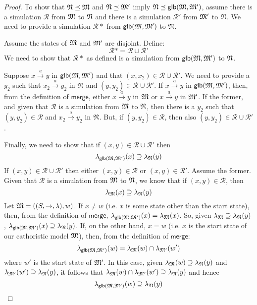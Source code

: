 \begin{proof}
To show that $\frak{N} \preceq \frak{M}$ and $\frak{N} \preceq \frak{M}'$ imply $\frak{N} \preceq \mathsf{glb}(\frak{M}, \frak{M}')$, assume there is a simulation $\mathcal{R}$ from $\frak{M}$ to $\frak{N}$ and there is a simulation $\mathcal{R}'$ from $\frak{M}'$ to $\frak{N}$.
We need to provide a simulation $\mathcal{R}*$ from $\mathsf{glb}(\frak{M}, \frak{M}')$ to $\frak{N}$.

Assume the states of $\frak{M}$ and $\frak{M}'$ are disjoint.
Define:
\[
\mathcal{R}* = \mathcal{R} \cup \mathcal{R}'
\]
We need to show that $\mathcal{R}*$ as defined is a simulation from $\mathsf{glb}(\frak{M}, \frak{M}')$ to $\frak{N}$.

Suppose $x \xrightarrow{a} y$ in $\mathsf{glb}(\frak{M}, \frak{M}')$ and that $(x,x_2) \in \mathcal{R} \cup \mathcal{R}'$.
We need to provide a $y_2$ such that $x_2 \xrightarrow{a} y_2$ in  $\frak{N}$ and $(y,y_2) \in \mathcal{R} \cup \mathcal{R}'$.
If  $x \xrightarrow{a} y$ in $\mathsf{glb}(\frak{M}, \frak{M}')$, then, from the definition of $\mathsf{merge}$, either $x \xrightarrow{a} y$ in $\frak{M}$ or $x \xrightarrow{a} y$ in $\frak{M}'$. If the former, and given that $\mathcal{R}$ is a simulation from $\frak{M}$ to $\frak{N}$, then there is a $y_2$ such that $(y,y_2) \in \mathcal{R}$ and $x_2 \xrightarrow{a} y_2$ in $\frak{N}$. But, if $(y,y_2) \in \mathcal{R}$, then also $(y,y_2) \in \mathcal{R} \cup \mathcal{R}'$.

Finally, we need to show that if $(x,y) \in \mathcal{R} \cup \mathcal{R}'$ then
\[
\lambda_{\mathsf{glb}(\frak{M}, \frak{M}')}(x) \supseteq \lambda_{\frak{N}}(y)
\]
If $(x,y) \in \mathcal{R} \cup \mathcal{R}'$ then either $(x,y) \in \mathcal{R}$ or $(x,y) \in \mathcal{R}'$.
Assume the former.
Given that $\mathcal{R}$ is a simulation from $\frak{M}$ to $\frak{N}$, we know that if $(x,y) \in \mathcal{R}$, then 
\[
\lambda_{\frak{M}}(x) \supseteq \lambda_{\frak{N}}(y)
\]
Let $\frak{M} = ((S,\rightarrow,\lambda),w)$.
If $x \neq w$ (i.e. $x$ is some state other than the start state), then, from the definition of $\mathsf{merge}$, $\lambda_{\mathsf{glb}(\frak{M}, \frak{M}')}(x) = \lambda_{\frak{M}}(x)$.
So, given $\lambda_{\frak{M}} \supseteq \lambda_{\frak{N}}(y)$, $\lambda_{\mathsf{glb}(\frak{M}, \frak{M}')}(x) \supseteq \lambda_{\frak{N}}(y)$.
If, on the other hand, $x = w$ (i.e. $x$ is the start state  of our cathoristic model $\frak{M}$), then, from the definition of $\mathsf{merge}$:
\[
\lambda_{\mathsf{glb}(\frak{M}, \frak{M}')}(w) = \lambda_{\frak{M}}(w) \cap \lambda_{\frak{M}'}(w')
\]
where $w'$ is the start state  of $\frak{M}'$.
In this case, given $\lambda_{\frak{M}}(w) \supseteq \lambda_{\frak{N}}(y)$ and $\lambda_{\frak{M}'}(w') \supseteq \lambda_{\frak{N}}(y)$, it follows that $\lambda_{\frak{M}}(w) \cap \lambda_{\frak{M}'}(w') \supseteq \lambda_{\frak{N}}(y)$ and hence 
\[
\lambda_{\mathsf{glb}(\frak{M}, \frak{M}')}(w) \supseteq \lambda_{\frak{N}}(y)
\]
\end{proof}

